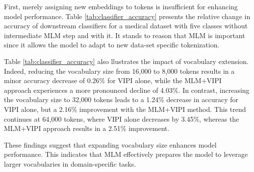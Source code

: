 \documentclass[11pt]{article}
\begin{document}
First, merely assigning new embeddings to tokens is insufficient for enhancing model performance. Table \ref{tab:classifier_accuracy} presents the relative change in accuracy of downstream classifiers for a medical dataset with five classes without intermediate MLM step and with it. It stands to reason that MLM is important since it allows the model to adapt to new data-set specific tokenization.



Table \ref{tab:classifier_accuracy} also llustrates the impact of vocabulary extension. Indeed, reducing the vocabulary size from 16,000 to 8,000 tokens results in a minor accuracy decrease of 0.26\% for VIPI alone, while the MLM+VIPI approach experiences a more pronounced decline of 4.03\%. In contrast, increasing the vocabulary size to 32,000 tokens leads to a 1.24\% decrease in accuracy for VIPI alone, but a 2.16\% improvement with the MLM+VIPI method. This trend continues at 64,000 tokens, where VIPI alone decreases by 3.45\%, whereas the MLM+VIPI approach results in a 2.51\% improvement.

These findings suggest that expanding vocabulary size enhances model performance. This indicates that MLM effectively prepares the model to leverage larger vocabularies in domain-specific tasks.
\end{document}
